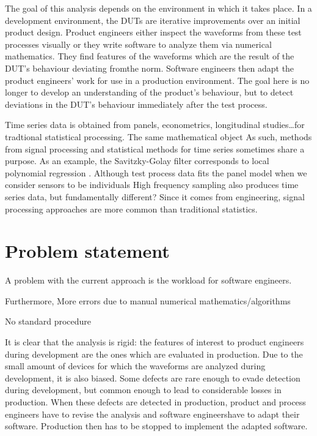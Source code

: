 The goal of this analysis depends on the environment in which it takes place.
In a development environment, the DUTs are iterative improvements over an initial product design.
Product engineers either inspect the waveforms from these test processes visually or they write software to analyze them via numerical mathematics. They find features of the waveforms which are the result of the DUT’s behaviour deviating fromthe norm. Software engineers then adapt the product engineers’ work for use in a production environment.
The goal here is no longer to develop an understanding of the product’s behaviour, but to detect deviations in the DUT’s behaviour immediately after the test process.

Time series data is  obtained from panels, econometrics, longitudinal studies\ldots for tradtional statistical processing.
The same mathematical object
As such, methods from signal processing and statistical methods for time series sometimes share a purpose.
As an example, the Savitzky-Golay filter \citep{savitzky1964smoothing} corresponds to local polynomial regression \citep{cleveland1979robust}.
Although test process data fits the panel model when we consider sensors to be individuals
High frequency sampling also produces time series data, but fundamentally different? Since it comes from engineering, signal processing approaches are more common than traditional statistics.

\section{Problem statement}

A problem with the current approach is the workload for software engineers.

Furthermore, More errors due to manual numerical mathematics/algorithms

No standard procedure

It is clear that the analysis is rigid: the features of interest to product engineers during development are the ones which are evaluated in production.
Due to the small amount of devices for which the waveforms are analyzed during development, it is also biased.
Some defects are rare enough to evade detection during development, but common enough to lead to considerable losses in production.
When these defects are detected in production, product and process engineers have to revise the analysis and software engineershave to adapt their software.
Production then has to be stopped to implement the adapted software.

